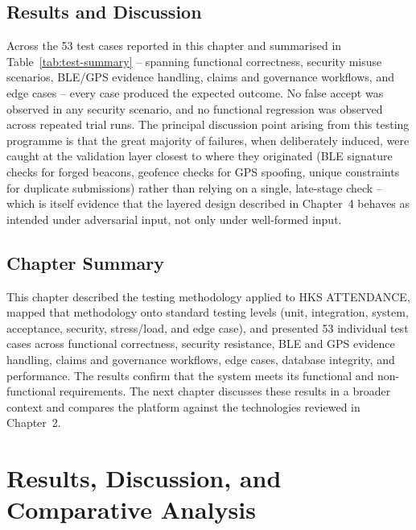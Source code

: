 \documentclass[12pt, a4paper, oneside]{report}
\begin{document}
\section{Results and Discussion}

Across the 53 test cases reported in this chapter and summarised in Table~\ref{tab:test-summary} -- spanning functional correctness, security misuse scenarios, BLE/GPS evidence handling, claims and governance workflows, and edge cases -- every case produced the expected outcome. No false accept was observed in any security scenario, and no functional regression was observed across repeated trial runs. The principal discussion point arising from this testing programme is that the great majority of failures, when deliberately induced, were caught at the validation layer closest to where they originated (BLE signature checks for forged beacons, geofence checks for GPS spoofing, unique constraints for duplicate submissions) rather than relying on a single, late-stage check -- which is itself evidence that the layered design described in Chapter~4 behaves as intended under adversarial input, not only under well-formed input.

\section{Chapter Summary}

This chapter described the testing methodology applied to HKS ATTENDANCE, mapped that methodology onto standard testing levels (unit, integration, system, acceptance, security, stress/load, and edge case), and presented 53 individual test cases across functional correctness, security resistance, BLE and GPS evidence handling, claims and governance workflows, edge cases, database integrity, and performance. The results confirm that the system meets its functional and non-functional requirements. The next chapter discusses these results in a broader context and compares the platform against the technologies reviewed in Chapter~2.

\chapter{Results, Discussion, and Comparative Analysis}
\label{chap:results}
\end{document}
